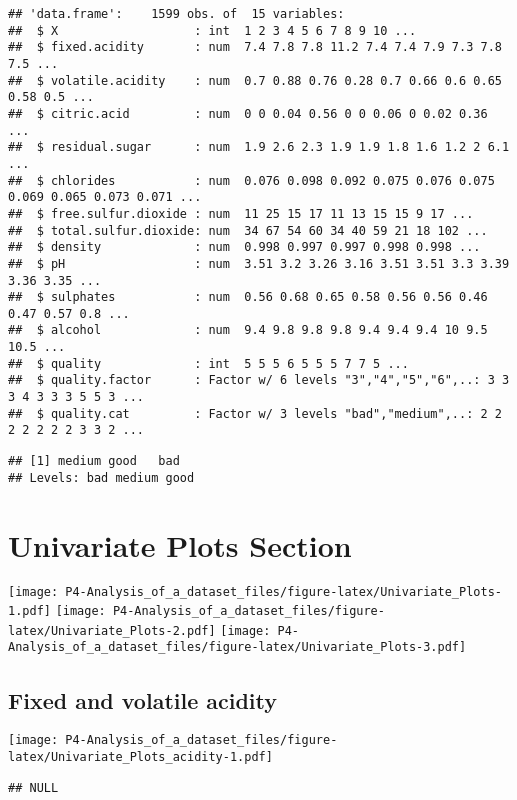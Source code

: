 \documentclass[]{article}
\begin{document}
\begin{verbatim}
## 'data.frame':    1599 obs. of  15 variables:
##  $ X                   : int  1 2 3 4 5 6 7 8 9 10 ...
##  $ fixed.acidity       : num  7.4 7.8 7.8 11.2 7.4 7.4 7.9 7.3 7.8 7.5 ...
##  $ volatile.acidity    : num  0.7 0.88 0.76 0.28 0.7 0.66 0.6 0.65 0.58 0.5 ...
##  $ citric.acid         : num  0 0 0.04 0.56 0 0 0.06 0 0.02 0.36 ...
##  $ residual.sugar      : num  1.9 2.6 2.3 1.9 1.9 1.8 1.6 1.2 2 6.1 ...
##  $ chlorides           : num  0.076 0.098 0.092 0.075 0.076 0.075 0.069 0.065 0.073 0.071 ...
##  $ free.sulfur.dioxide : num  11 25 15 17 11 13 15 15 9 17 ...
##  $ total.sulfur.dioxide: num  34 67 54 60 34 40 59 21 18 102 ...
##  $ density             : num  0.998 0.997 0.997 0.998 0.998 ...
##  $ pH                  : num  3.51 3.2 3.26 3.16 3.51 3.51 3.3 3.39 3.36 3.35 ...
##  $ sulphates           : num  0.56 0.68 0.65 0.58 0.56 0.56 0.46 0.47 0.57 0.8 ...
##  $ alcohol             : num  9.4 9.8 9.8 9.8 9.4 9.4 9.4 10 9.5 10.5 ...
##  $ quality             : int  5 5 5 6 5 5 5 7 7 5 ...
##  $ quality.factor      : Factor w/ 6 levels "3","4","5","6",..: 3 3 3 4 3 3 3 5 5 3 ...
##  $ quality.cat         : Factor w/ 3 levels "bad","medium",..: 2 2 2 2 2 2 2 3 3 2 ...
\end{verbatim}

\begin{verbatim}
## [1] medium good   bad   
## Levels: bad medium good
\end{verbatim}

\section{Univariate Plots Section}\label{univariate-plots-section}

\texttt{[image: P4-Analysis\_of\_a\_dataset\_files/figure-latex/Univariate\_Plots-1.pdf]}
\texttt{[image: P4-Analysis\_of\_a\_dataset\_files/figure-latex/Univariate\_Plots-2.pdf]}
\texttt{[image: P4-Analysis\_of\_a\_dataset\_files/figure-latex/Univariate\_Plots-3.pdf]}

\subsection{Fixed and volatile
acidity}\label{fixed-and-volatile-acidity}

\texttt{[image: P4-Analysis\_of\_a\_dataset\_files/figure-latex/Univariate\_Plots\_acidity-1.pdf]}

\begin{verbatim}
## NULL
\end{verbatim}
\end{document}
